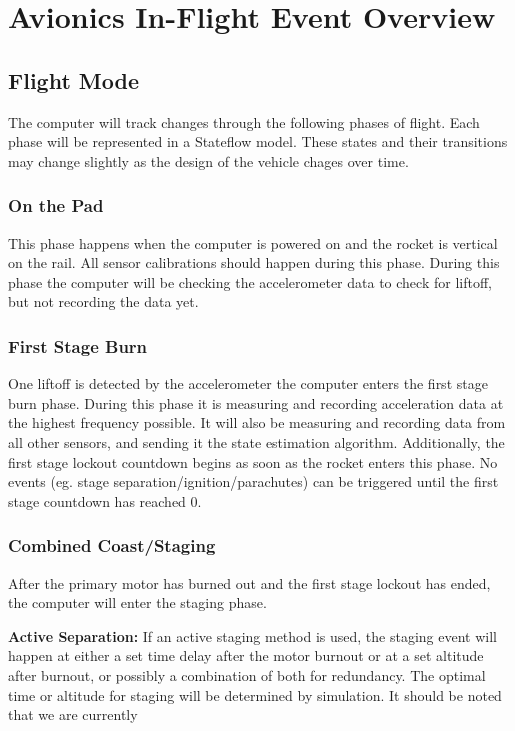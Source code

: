 \section{Avionics In-Flight Event Overview} \label{section:avionics-appendix}

\subsection*{Flight Mode}
The computer will track changes through the following phases of flight. Each phase will be represented in a Stateflow model. These states and their transitions may change slightly as the design of the vehicle chages over time.

\subsubsection*{On the Pad}
This phase happens when the computer is powered on and the rocket is vertical on the rail. All sensor calibrations should happen during this phase. During this phase the computer will be checking the accelerometer data to check for liftoff, but not recording the data yet. 

\subsubsection*{First Stage Burn}  %
One liftoff is detected by the accelerometer the computer enters the first stage burn phase. During this phase it is measuring and recording acceleration data at the highest frequency possible. It will also be measuring and recording data from all other sensors, and sending it the state estimation algorithm. Additionally, the first stage lockout countdown begins as soon as the rocket enters this phase. No events (eg. stage separation/ignition/parachutes) can be triggered until the first stage countdown has reached 0. 

\subsubsection*{Combined Coast/Staging}
After the primary motor has burned out and the first stage lockout has ended, the computer will enter the staging phase. 

\noindent\textbf{Active Separation:} If an active staging method is used, the staging event will happen at either a set time delay after the motor burnout or at a set altitude after burnout, or possibly a combination of both for redundancy. The optimal time or altitude for staging will be determined by simulation. It should be noted that we are currently

